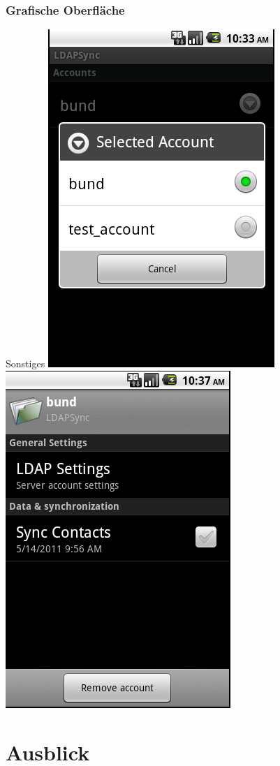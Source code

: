 \documentclass[hyperref={bookmarksopen=false}]{beamer}
\begin{document}
\begin{frame}[fragile]
	\frametitle{Grafische Oberfläche}
	\begin{block}{Sonstiges}
	\hspace{0.5 cm}
	\includegraphics[scale=0.3]{choose_active_Account_for_TabView.png}
	\vspace{1 cm}
	\includegraphics[scale=0.3]{specific_Account_Settings.png}
	\end{block}
\end{frame}

\section{Ausblick}

\end{document}
